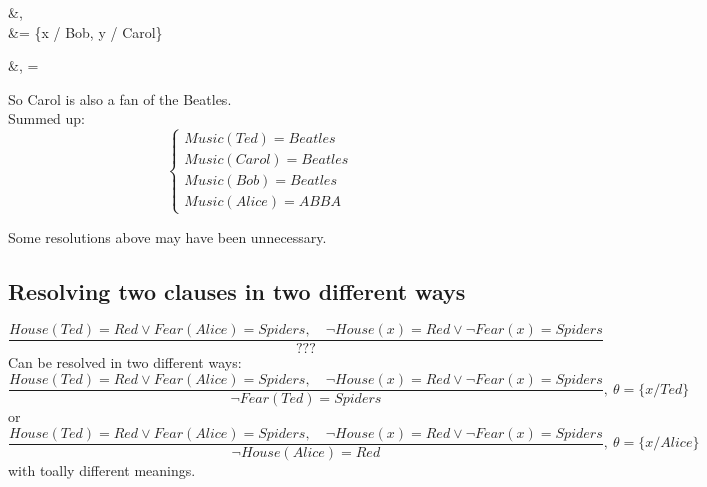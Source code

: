 \documentclass[a4paper, 11pt]{article}
\begin{document}
	\begin{alignedequations}{2}
		&, \\
		&\footnotesize\quad \theta = \{x / Bob, y / Carol\}
	\end{alignedequations}

	\begin{alignedequations}{2}
		&, \quad \theta = \emptyset
	\end{alignedequations}

	So Carol is also a fan of the Beatles. \\
	Summed up: 
	\begin{equation*}
		\begin{cases}
			Music(Ted) = Beatles \\
			Music(Carol) = Beatles \\
			Music(Bob) = Beatles \\
			Music(Alice) = ABBA
		\end{cases}
	\end{equation*}
    
    {\tiny Some resolutions above may have been unnecessary. }
	
	\subsection{Resolving two clauses in two different ways}
	\begin{equation}
		\frac{House(Ted) = Red \vee Fear(Alice) = Spiders, \quad \neg House(x) = Red \vee \neg Fear(x) = Spiders}{???}
	\end{equation}
	Can be resolved in two different ways:
	\begin{equation}
		\frac{House(Ted) = Red \vee Fear(Alice) = Spiders, \quad \neg House(x) = Red \vee \neg Fear(x) = Spiders}{\neg Fear(Ted) = Spiders}, ~ \theta = \{x/Ted\}
	\end{equation}
	or 
	\begin{equation}
		\frac{House(Ted) = Red \vee Fear(Alice) = Spiders, \quad \neg House(x) = Red \vee \neg Fear(x) = Spiders}{\neg House(Alice) = Red}, ~ \theta = \{x/Alice\}
	\end{equation}
    with toally different meanings.
\end{document}
